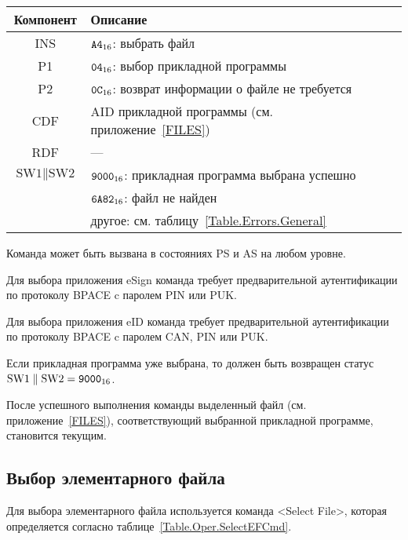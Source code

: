 \begin{table}[hbt]
\caption{}\label{Table.Oper.SelectAppCmd}
\begin{tabular}{|c|p{14cm}|}
\hline
Компонент & Описание \\
\hline
\hline
INS & $\texttt{A4}_{16}$: выбрать файл\\ 
\hline
P1 & $\texttt{04}_{16}$: выбор прикладной программы\\
\hline
P2 & $\texttt{0C}_{16}$: возврат информации о файле не требуется \\
\hline
CDF & AID прикладной программы (см. приложение~\ref{FILES})\\
\hline 
RDF &  --- \\
\hline
$\text{SW1}\parallel\text{SW2}$ & 
$\texttt{9000}_{16}$: прикладная программа выбрана успешно \\
  & $\texttt{6A82}_{16}$: файл не найден \\
  & другое: см. таблицу~\ref{Table.Errors.General}\\
\hline
\end{tabular}
\end{table}

Команда может быть вызвана в состояниях PS и AS
на любом уровне.

Для выбора приложения eSign команда требует 
предварительной аутентификации по протоколу 
BPACE c паролем PIN или PUK.

Для выбора приложения eID команда требует 
предварительной аутентификации по протоколу BPACE c 
паролем CAN, PIN или PUK.

Если прикладная программа уже выбрана, то должен быть возвращен
статус $\text{SW1} \parallel \text{SW2} = \texttt{9000}_{16}$.

После успешного выполнения команды выделенный файл 
(см. приложение~\ref{FILES}), 
соответствующий выбранной прикладной программе, становится текущим.


\subsection{Выбор элементарного файла}
\label{Oper.Descr.SelectEF}

Для выбора элементарного файла используется 
команда <Select File>, 
которая определяется согласно 
таблице~\ref{Table.Oper.SelectEFCmd}.

